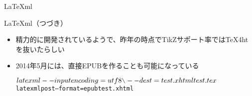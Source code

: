 \begin{frame}[containsverbatim, t]{\inhibitglue \LaTeX{}ml}
  \sffamily
  
\end{frame}

\begin{frame}[containsverbatim, t]{\inhibitglue \LaTeX{}ml（つづき）}
  \sffamily
  
  \begin{itemize}
    \item 精力的に開発されているようで、昨年の時点でTikZサポート率では\TeX{}4htを抜いたらしい
    \item 2014年5月には、直接EPUBを作ることも可能になっている\\
    \begin{alltt}\small
$ latexml --inputencoding=utf8 {\bslash}
          --dest=test.xhtml test.tex
$ latexmlpost --format=epub test.xhtml
    \end{alltt}
  \end{itemize}
\end{frame}
